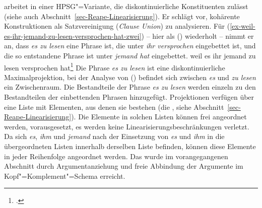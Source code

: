 {
\label{sec-anhebung-diskontinuierliche-konstituenten}


\mbox{}\citet{Reape94a} arbeitet in einer HPSG"=Variante, die diskontinuierliche
Konstituenten zulässt (siehe auch Abschnitt~\ref{sec-Reape-Linearisierung}). 
Er schlägt vor, kohärente Konstruktionen
als Satzvereinigung (\emph{Clause Union}) zu analysieren.
Für (\ref{ex-weil-es-ihr-jemand-zu-lesen-versprochen-hat-zwei}) -- hier als ()
wiederholt -- nimmt er an, dass \emph{es zu lesen} eine Phrase ist, die unter
\emph{ihr versprochen} eingebettet ist, und die so entstandene Phrase ist unter \emph{jemand hat}
eingebettet.
\ea
\label{ex-weil-es-ihr-jemand-zu-lesen-versprochen-hat-drei}
weil    es       ihr       jemand   zu lesen versprochen hat\footnote{
\textcites[]{Haider86c}[]{Haider90b}.%
}
\z
Die Phrase \emph{es zu lesen} ist eine diskontinuierliche Maximalprojektion, \dash
bei der Analyse von () befindet sich zwischen \emph{es} und \emph{zu lesen} 
ein Zwischenraum. Die Bestandteile der Phrase \emph{es zu lesen} werden einzeln
zu den Bestandteilen der einbettenden Phrasen hinzugefügt. Projektionen verfügen
über eine Liste mit Elementen, aus denen sie bestehen (die \doml, siehe
Abschnitt~\ref{sec-Reape-Linearisierung}). Die Elemente in solchen Listen 
können frei angeordnet werden, vorausgesetzt, es werden keine Linearisierungsbeschränkungen
verletzt. Da sich \emph{es}, \emph{ihm} und \emph{jemand} nach der Einsetzung von \emph{es}
und \emph{ihm} in die übergeordneten Listen innerhalb derselben Liste befinden, können
diese Elemente in jeder Reihenfolge angeordnet werden. Das wurde im vorangegangenen
Abschnitt durch Argumentanziehung und freie Abbindung der Argumente im Kopf"=Komplement"=Schema
erreicht.

}
